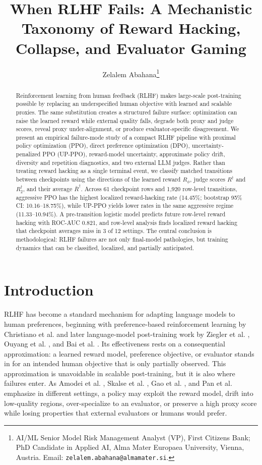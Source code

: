 \documentclass[11pt]{article}
\title{When RLHF Fails: A Mechanistic Taxonomy of Reward Hacking, Collapse, and Evaluator Gaming}
\author{Zelalem Abahana\thanks{AI/ML Senior Model Risk Management Analyst (VP), First Citizens Bank; PhD Candidate in Applied AI, Alma Mater Europaea University, Vienna, Austria. Email: \texttt{zelalem.abahana@almamater.si}.}}
\date{}
\newcommand{\Rphi}{R_{\phi}}
\newcommand{\Rdag}{R^{\dagger}}
\newcommand{\Rtwo}{R^{\dagger}_2}
\newcommand{\Rbar}{\bar R^{\dagger}}
\begin{document}
\maketitle

\begin{abstract}
Reinforcement learning from human feedback (RLHF) makes large-scale post-training possible by replacing an underspecified human objective with learned and scalable proxies. The same substitution creates a structured failure surface: optimization can raise the learned reward while external quality falls, degrade both proxy and judge scores, reveal proxy under-alignment, or produce evaluator-specific disagreement. We present an empirical failure-mode study of a compact RLHF pipeline with proximal policy optimization (PPO), direct preference optimization (DPO), uncertainty-penalized PPO (UP-PPO), reward-model uncertainty, approximate policy drift, diversity and repetition diagnostics, and two external LLM judges. Rather than treating reward hacking as a single terminal event, we classify matched transitions between checkpoints using the directions of the learned reward $\Rphi$, judge scores $\Rdag$ and $\Rtwo$, and their average $\Rbar$. Across 61 checkpoint rows and 1,920 row-level transitions, aggressive PPO has the highest localized reward-hacking rate (14.45\%; bootstrap 95\% CI: 10.16--18.75\%), while UP-PPO yields lower rates in the same aggressive regime (11.33--10.94\%). A pre-transition logistic model predicts future row-level reward hacking with ROC-AUC 0.821, and row-level analysis finds localized reward hacking that checkpoint averages miss in 3 of 12 settings. The central conclusion is methodological: RLHF failures are not only final-model pathologies, but training dynamics that can be classified, localized, and partially anticipated.
\end{abstract}

\section{Introduction}
RLHF has become a standard mechanism for adapting language models to human preferences, beginning with preference-based reinforcement learning by Christiano et al. \cite{christiano2017deep} and later language-model post-training work by Ziegler et al. \cite{ziegler2019fine}, Ouyang et al. \cite{ouyang2022training}, and Bai et al. \cite{bai2022training}. Its effectiveness rests on a consequential approximation: a learned reward model, preference objective, or evaluator stands in for an intended human objective that is only partially observed. This approximation is unavoidable in scalable post-training, but it is also where failures enter. As Amodei et al. \cite{amodei2016concrete}, Skalse et al. \cite{skalse2022defining}, Gao et al. \cite{gao2023scaling}, and Pan et al. \cite{pan2023feedback} emphasize in different settings, a policy may exploit the reward model, drift into low-quality regions, over-specialize to an evaluator, or preserve a high proxy score while losing properties that external evaluators or humans would prefer.
\end{document}
